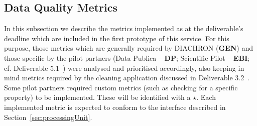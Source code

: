 
\subsection{Data Quality Metrics}
\label{sec:DQMetrics} 
In this subsection we describe the metrics implemented as at the deliverable's deadline which are included in the first prototype of this service.
For this purpose, those metrics which are generally required by DIACHRON (\textbf{GEN}) and those specific by the pilot partners (Data Publica – \textbf{DP};  Scientific Pilot – \textbf{EBI}; cf. Deliverable 5.1~\cite[section 4]{diachron-d5.1}) were analysed and prioritised accordingly, also keeping in mind metrics required by the cleaning application discussed in Deliverable 3.2~\cite{diachron-d3.2}.
Some pilot partners required custom metrics (such as checking for a specific property) to be implemented.
These will be identified with a $\star$.
Each implemented metric is expected to conform to the interface described in Section~\ref{sec:processingUnit}.






